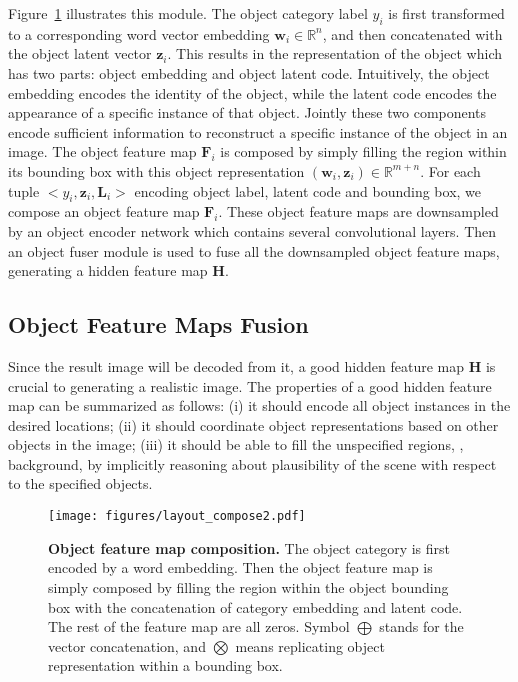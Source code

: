 \documentclass[10pt,twocolumn,letterpaper]{article}
\begin{document}
Figure~\ref{fig:layout_composition} illustrates this module.
The object category label $y_i$ is first transformed to a corresponding word vector embedding $\mathbf{w}_i \in \mathbb{R}^{n}$, and then concatenated with the object latent vector $\mathbf{z}_i$. 
This results in the representation of the object which has two parts: object embedding and object latent code. Intuitively, the object embedding encodes the identity of the object, while the latent code encodes the appearance of a specific instance of that object. Jointly these two components encode sufficient information to reconstruct a specific instance of the object in an image. 
The object feature map $\mathbf{F}_i$ is composed by simply filling the region within its bounding box with this object representation $(\mathbf{w}_i, \mathbf{z}_i) \in \mathbb{R}^{m+n}$.
For each  tuple $<y_i, \mathbf{z}_i, \mathbf{L}_i>$ encoding object label, latent code and bounding box, we compose an object feature map $\mathbf{F}_i$. 
These object feature maps are downsampled by an object encoder network which contains several convolutional layers. 
Then an object fuser module is used to fuse all the downsampled object feature maps, generating a hidden feature map $\mathbf{H}$.




\subsection{Object Feature Maps Fusion}
Since the result image will be decoded from it, a good hidden feature map $\mathbf{H}$ is crucial to generating a realistic image. 
The properties of a good hidden feature map can be summarized as follows:
(i) it should encode all object instances in the desired locations; 
(ii) it should coordinate object representations based on other objects in the image;
(iii) it should be able to fill the unspecified regions, \eg, background, by implicitly reasoning about plausibility of the scene with respect to the specified objects. 

\begin{figure}[!t]
    \begin{center}
\texttt{[image: figures/layout\_compose2.pdf]}
    \end{center}
    \caption{{\bf Object feature map composition.} The object category is first encoded by a word embedding. Then the object feature map is simply composed by filling the region within the object bounding box with the concatenation of category embedding and latent code. The rest of the feature map are all zeros. Symbol $\bigoplus$ stands for the vector concatenation, and $\bigotimes$ means replicating object representation within a bounding box.}
    \label{fig:layout_composition}
    \vspace{-0.1in}
\end{figure}
\end{document}
